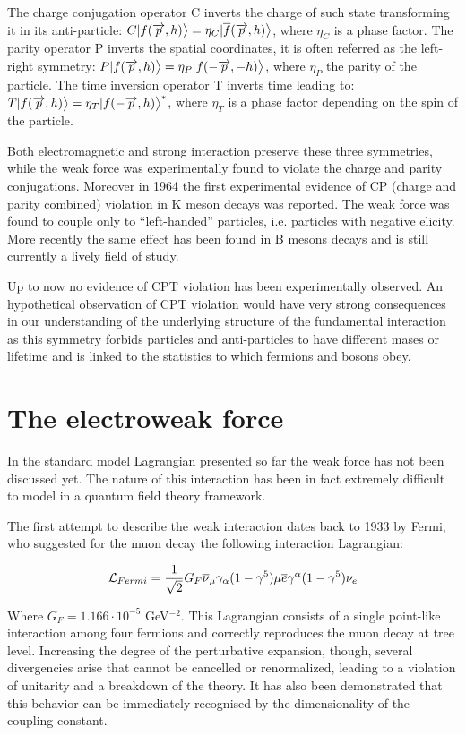 The charge conjugation operator C inverts the charge of such state transforming it in its anti-particle: $C|f(\overrightarrow{p}, h)\big{>} = \eta_C|\overline{f}(\overrightarrow{p}, h)\big{>}$, where $\eta_C$ is a phase factor. The parity operator P inverts the spatial coordinates, it is often referred as the left-right symmetry: $P|f(\overrightarrow{p}, h)\big{>} = \eta_P|f(-\overrightarrow{p}, -h)\big{>}$, where $\eta_P$ the parity of the particle. The time inversion operator T inverts time leading to: $T|f(\overrightarrow{p}, h)\big{>} = \eta_T|f(-\overrightarrow{p}, h)\big{>}^*$, where $\eta_T$ is a phase factor depending on the spin of the particle.

Both electromagnetic and strong interaction preserve these three symmetries, while the weak force was experimentally found to violate the charge and parity conjugations. Moreover in 1964 the first experimental evidence of CP (charge and parity combined) violation in K meson decays \cite{PhysRevLett.13.138} was reported. The weak force was found to couple only to ``left-handed'' particles, i.e. particles with negative elicity. More recently the same effect has been found in B mesons decays and is still currently a lively field of study. 

Up to now no evidence of CPT violation has been experimentally observed. An hypothetical observation of CPT violation would have very strong consequences in our understanding of the underlying structure of the fundamental interaction as this symmetry forbids particles and anti-particles to have different mases or lifetime and is linked to the statistics to which fermions and bosons obey.

\section{The electroweak force}

In the standard model Lagrangian presented so far the weak force has not been discussed yet. The nature of this interaction has been in fact extremely difficult to model in a quantum field theory framework.

The first attempt to describe the weak interaction dates back to 1933 by Fermi, who suggested for the muon decay the following interaction Lagrangian:

\begin{equation}
\mathcal{L}_{Fermi} = \dfrac{1}{\sqrt{2}} G_F \overline{\nu}_\mu \gamma_\alpha (1-\gamma^5) \mu \overline{e} \gamma^\alpha (1-\gamma^5) \nu_e
\label{eq:l_fermi}
\end{equation}

Where $G_F = 1.166 \cdot 10^{-5}$ GeV$^{-2}$. This Lagrangian consists of a single point-like interaction among four fermions and correctly reproduces the muon decay at tree level. Increasing the degree of the perturbative expansion, though, several divergencies arise that cannot be cancelled or renormalized, leading to a violation of unitarity and a breakdown of the theory. It has also been demonstrated that this behavior can be immediately recognised by the dimensionality of the coupling constant.

